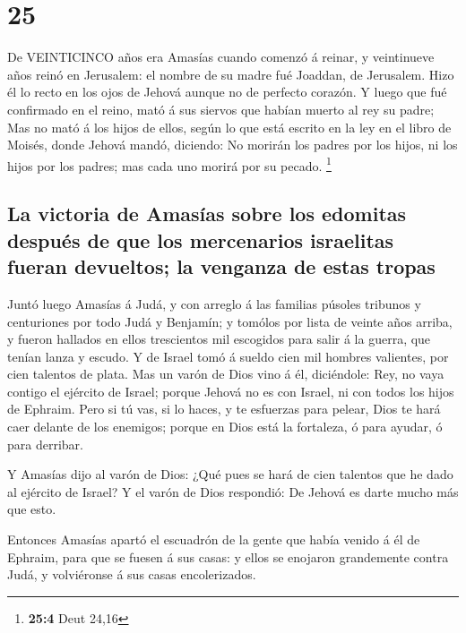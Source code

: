 \hypertarget{section-24}{%
\section{25}\label{section-24}}

 De VEINTICINCO años era Amasías cuando comenzó á reinar, y
veintinueve años reinó en Jerusalem: el nombre de su madre fué Joaddan,
de Jerusalem.  Hizo él lo recto en los ojos de Jehová aunque
no de perfecto corazón.  Y luego que fué confirmado en el
reino, mató á sus siervos que habían muerto al rey su padre;
 Mas no mató á los hijos de ellos, según lo que está escrito
en la ley en el libro de Moisés, donde Jehová mandó, diciendo: No
morirán los padres por los hijos, ni los hijos por los padres; mas cada
uno morirá por su pecado. \footnote{\textbf{25:4} Deut 24,16}

\hypertarget{la-victoria-de-amasuxedas-sobre-los-edomitas-despuuxe9s-de-que-los-mercenarios-israelitas-fueran-devueltos-la-venganza-de-estas-tropas}{%
\subsection{La victoria de Amasías sobre los edomitas después de que los
mercenarios israelitas fueran devueltos; la venganza de estas
tropas}\label{la-victoria-de-amasuxedas-sobre-los-edomitas-despuuxe9s-de-que-los-mercenarios-israelitas-fueran-devueltos-la-venganza-de-estas-tropas}}

 Juntó luego Amasías á Judá, y con arreglo á las familias
púsoles tribunos y centuriones por todo Judá y Benjamín; y tomólos por
lista de veinte años arriba, y fueron hallados en ellos trescientos mil
escogidos para salir á la guerra, que tenían lanza y escudo.
 Y de Israel tomó á sueldo cien mil hombres valientes, por
cien talentos de plata.  Mas un varón de Dios vino á él,
diciéndole: Rey, no vaya contigo el ejército de Israel; porque Jehová no
es con Israel, ni con todos los hijos de Ephraim.  Pero si
tú vas, si lo haces, y te esfuerzas para pelear, Dios te hará caer
delante de los enemigos; porque en Dios está la fortaleza, ó para
ayudar, ó para derribar.

 Y Amasías dijo al varón de Dios: ¿Qué pues se hará de cien
talentos que he dado al ejército de Israel? Y el varón de Dios
respondió: De Jehová es darte mucho más que esto.

 Entonces Amasías apartó el escuadrón de la gente que había
venido á él de Ephraim, para que se fuesen á sus casas: y ellos se
enojaron grandemente contra Judá, y volviéronse á sus casas
encolerizados.

